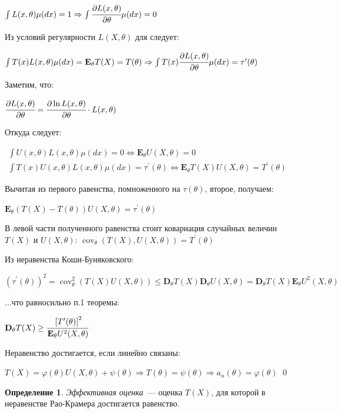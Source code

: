\documentclass[oneside,final,14pt]{extreport}
\renewenvironment{proof}{{\bfseries Доказательство.}}{\qed}
\theoremstyle{definition}
\newtheorem{defn}{Определение}[section]
\begin{document}
\begin{proof}
\( \int L(x, \theta) \mu(d x)=1 \Rightarrow \int \cfrac{\partial L(x, \theta)}{\partial \theta} \mu(d x)=0 \)

Из условий регулярности \( L(X, \theta)\) для следует:

\( \int T(x) L(x, \theta) \mu(d x)=\mathbf{E}_{\theta} T(X)=T(\theta) \Rightarrow \int T(x) \cfrac{\partial L(x, \theta)}{\partial \theta} \mu(d x)=\tau^{\prime}(\theta) \)

Заметим, что:

\( \cfrac{\partial L(x, \theta)}{\partial \theta}=\cfrac{\partial \ln L(x, \theta)}{\partial \theta} \cdot L(x, \theta) \)

Откуда следует:

\( \begin{array}{c}
\int U(x, \theta) L(x, \theta) \mu(d x)=0 \Leftrightarrow \mathbf{E}_{\theta} U(X, \theta)=0 \\
\int T(x) U(x, \theta) L(x, \theta) \mu(d x)=\tau^{\prime}(\theta) \Leftrightarrow \mathbf{E}_{\theta} T(X) U(X, \theta)=T^{\prime}(\theta)
\end{array} \)

Вычитая из первого равенства, помноженного на \(\tau(\theta)\), второе, получаем:

\( \mathbf{E}_{\theta}(T(X)-T(\theta)) U(X, \theta)=\tau^{\prime}(\theta) \)

В левой части полученного равенства стоит ковариация случайных величин \(T(X)\) и \(U(X,\theta)\): \( \operatorname{cov}_{\theta}(T(X), U(X, \theta))=T^{\prime}(\theta) \)

Из неравенства Коши-Буняковского:

\(\left(\tau^{\prime}(\theta)\right)^{2}=\operatorname{cov}_{\theta}^{2}(T(X) U(X, \theta)) \leq \mathbf{D}_{\theta} T(X) \mathbf{D}_{\theta} U(X, \theta)=\mathbf{D}_{\theta} T(X) \mathbf{E}_{\theta} U^{2}(X, \theta) \)

...что равносильно п.1 теоремы:

\( \mathbf{D}_{\theta} T(X) \geq \cfrac{\left[T^{\prime}(\theta)\right]^{2}}{\mathbf{E}_{\theta} U^{2}(X, \theta)} \)

Неравенство достигается, если линейно связаны:

\( T(X)=\varphi(\theta) U(X, \theta)+\psi(\theta) \Rightarrow T(\theta)=\psi(\theta) \Rightarrow a_{n}(\theta)=\varphi(\theta) \)
\end{proof}

\begin{defn}
{\it Эффективная оценка}~--- оценка \(T(X)\), для которой в неравенстве Рао-Крамера достигается равенство.
\end{defn}
\end{document}
